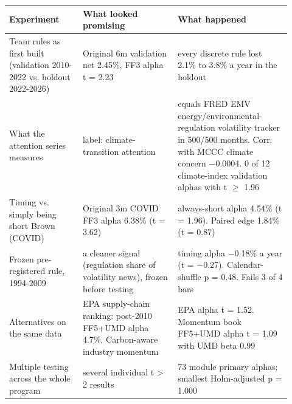 \begin{tabular}{p{0.24\linewidth}p{0.31\linewidth}p{0.37\linewidth}}
\toprule
Experiment & What looked promising & What happened \\
\midrule
Team rules as first built (validation 2010-2022 vs. holdout 2022-2026) & Original 6m validation net 2.45\%, FF3 alpha t = 2.23 & every discrete rule lost 2.1\% to 3.8\% a year in the holdout \\
What the attention series measures & label: climate-transition attention & equals FRED EMV energy/environmental-regulation volatility tracker in 500/500 months. Corr. with MCCC climate concern $-$0.0004. 0 of 12 climate-index validation alphas with t $\geq$ 1.96 \\
Timing vs. simply being short Brown (COVID) & Original 3m COVID FF3 alpha 6.38\% (t = 3.62) & always-short alpha 4.54\% (t = 1.96). Paired edge 1.84\% (t = 0.87) \\
Frozen pre-registered rule, 1994-2009 & a cleaner signal (regulation share of volatility news), frozen before testing & timing alpha $-$0.18\% a year (t = $-$0.27). Calendar-shuffle p = 0.48. Fails 3 of 4 bars \\
Alternatives on the same data & EPA supply-chain ranking: post-2010 FF5+UMD alpha 4.7\%. Carbon-aware industry momentum & EPA alpha t = 1.52. Momentum book FF5+UMD alpha t = 1.09 with UMD beta 0.99 \\
Multiple testing across the whole program & several individual t > 2 results & 73 module primary alphas: smallest Holm-adjusted p = 1.000 \\
\bottomrule
\end{tabular}
